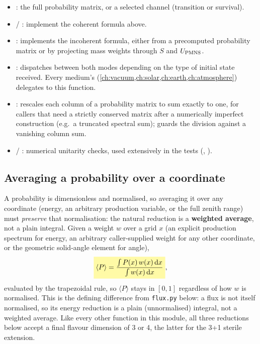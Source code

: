 \begin{implbox}
\begin{itemize}
  \item {}: the full probability
    matrix, or a selected channel (transition or survival).
  \item {} / :
    implement the coherent formula above.
  \item {}: implements the incoherent
    formula, either from a precomputed probability matrix or by projecting
    mass weights through $S$ and $U_{\rm PMNS}$.
  \item {}: dispatches between both
    modes depending on the type of initial state received. Every medium's
     (\cref{ch:vacuum,ch:solar,ch:earth,ch:atmosphere})
    delegates to this function.
  \item {}: rescales
    each column of a probability matrix to sum exactly to one, for callers
    that need a strictly conserved matrix after a numerically imperfect
    construction (e.g.\ a truncated spectral sum);  guards the
    division against a vanishing column sum.
  \item {} / :
    numerical unitarity checks, used extensively in the tests
    (, ).
\end{itemize}
\end{implbox}

\begin{theorybox}
\subsection*{Averaging a probability over a coordinate}
A probability is dimensionless and normalised, so averaging it over any
coordinate (energy, an arbitrary production variable, or the full zenith
range) must \emph{preserve} that normalisation: the natural reduction is a
\textbf{weighted average}, not a plain integral. Given a weight $w$ over a
grid $x$ (an explicit production spectrum for energy, an arbitrary
caller-supplied weight for any other coordinate, or the geometric
solid-angle element for angle),
\begin{equation}
  \keyresult{\langle P\rangle = \frac{\int P(x)\,w(x)\,\mathrm{d}x}{\int w(x)\,\mathrm{d}x}},
\end{equation}
evaluated by the trapezoidal rule, so $\langle P\rangle$ stays in $[0,1]$
regardless of how $w$ is normalised. This is the defining difference from
\texttt{flux.py} below: a flux is not itself normalised, so its energy
reduction is a plain (unnormalised) integral, not a weighted average. Like
every other function in this module, all three reductions below accept a
final flavour dimension of 3 or 4, the latter for the 3+1 sterile
extension.
\end{theorybox}

